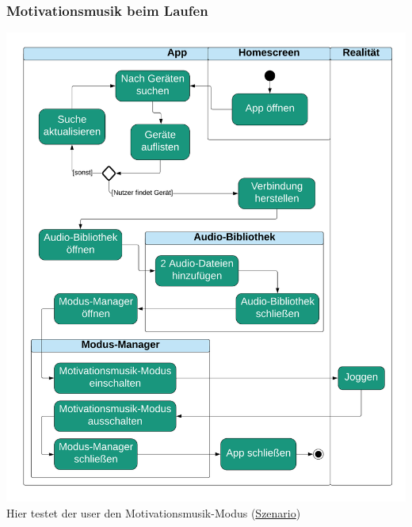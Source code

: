 \documentclass[../pflichtenheft.tex]{subfiles}
\begin{document}
		\subsubsection{Motivationsmusik beim Laufen}
		\label{sec:motivation}
			\includegraphics[page=1,width=400pt,keepaspectratio]{../graphics/UML/Motivationsmusik_beim_Laufen.png}
			Hier testet der \Gls{user} den Motivationsmusik-Modus (\hyperref[sec:motivationS]{Szenario})
\end{document}
